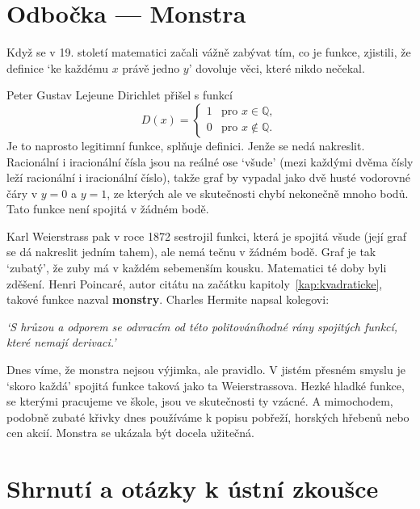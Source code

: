 \section{Odbočka --- Monstra}

Když se v 19. století matematici začali vážně zabývat tím, co je funkce, zjistili, že definice `ke každému $x$ právě jedno $y$' dovoluje věci, které nikdo nečekal.

Peter Gustav Lejeune Dirichlet přišel s funkcí
\begin{equation*}
  D(x) = \begin{cases}
    1 & \text{pro } x\in\mathbb{Q},\\
    0 & \text{pro } x\notin\mathbb{Q}.
  \end{cases}
\end{equation*}
Je to naprosto legitimní funkce, splňuje definici. Jenže se nedá nakreslit. Racionální i iracionální čísla jsou na reálné ose `všude' (mezi každými dvěma čísly leží racionální i iracionální číslo), takže graf by vypadal jako dvě husté vodorovné čáry v $y = 0$ a $y = 1$, ze kterých ale ve skutečnosti chybí nekonečně mnoho bodů. Tato funkce není spojitá v žádném bodě.

Karl Weierstrass pak v roce 1872 sestrojil funkci, která je spojitá všude (její graf se dá nakreslit jedním tahem), ale nemá tečnu v žádném bodě. Graf je tak `zubatý', že zuby má v každém sebemenším kousku. Matematici té doby byli zděšení. Henri Poincaré, autor citátu na začátku kapitoly~\ref{kap:kvadraticke}, takové funkce nazval \textbf{monstry}. Charles Hermite napsal kolegovi:
\begin{center}
  \textit{`S hrůzou a odporem se odvracím od této politováníhodné rány spojitých funkcí, které nemají derivaci.'}
\end{center}
Dnes víme, že monstra nejsou výjimka, ale pravidlo. V jistém přesném smyslu je `skoro každá' spojitá funkce taková jako ta Weierstrassova. Hezké hladké funkce, se kterými pracujeme ve škole, jsou ve skutečnosti ty vzácné. A mimochodem, podobně zubaté křivky dnes používáme k popisu pobřeží, horských hřebenů nebo cen akcií. Monstra se ukázala být docela užitečná.

\section{Shrnutí a otázky k ústní zkoušce}

